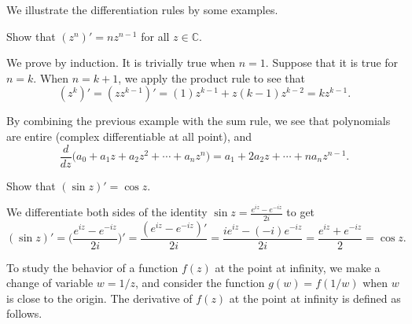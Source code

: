We illustrate the differentiation rules by some examples.

\begin{example}
	Show that $(z^n)' = nz^{n-1}$ for all $z\in\mathbb{C}$.
	
	We prove by induction. It is trivially true when $n=1$.  Suppose that it is true for $n=k$. When $n=k+1$, we apply the product rule to see that
	$$
	(z^k)' = (z z^{k-1})' =(1) z^{k-1} + z (k-1)z^{k-2} = kz^{k-1}.
	$$
\end{example}


\begin{example} 	\label{ex:polynomial_differentiable}
	By combining the previous example with the sum rule, we see that polynomials are entire (complex differentiable at all point), and
	$$
	\frac{d}{dz} \big( a_0 + a_1 z + a_2 z^2 + \cdots + a_n z^n\big) =
	a_1 + 2a_2 z + \cdots + n a_n z^{n-1}.
	$$
\end{example}

\begin{example}
	Show that $(\sin z)' = \cos z$.
	
	We differentiate both sides of the identity $\sin z = \frac{e^{iz} - e^{-iz}}{2i}$ to get
	$$
	(\sin z)' = \Big( \frac{e^{iz} - e^{-iz}}{2i} \Big)' = \frac{(e^{iz} - e^{-iz})'}{2i}
	= \frac{ie^{iz} - (-i) e^{-iz}}{2i} = \frac{e^{iz} + e^{-iz}}{2} = \cos z.
	$$
\end{example}




To study the behavior of a function $f(z)$ at the point at infinity, we make a change of variable $w=1/z$, and consider the function $g(w) = f(1/w)$ when $w$ is close to the origin. The derivative of $f(z)$ at the point at infinity is defined as follows.

